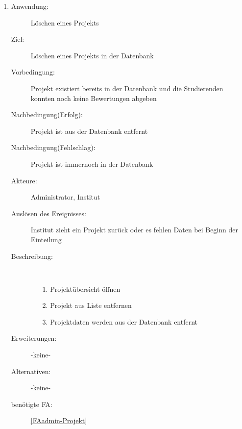 \documentclass[parskip=full]{scrartcl}
\newcommand{\swtLabel}[1]{\textbf{/#1\arabic*0/}}
\begin{document}
\begin{enumerate} [label=\swtLabel{A}]
  
  \item
  \begin{description}
  \item[Anwendung:] Löschen eines Projekts
  \item[Ziel:] Löschen eines Projekts in der Datenbank
  	\item[Vorbedingung:] Projekt existiert bereits in der Datenbank und die
  	Studierenden konnten noch keine Bewertungen abgeben
  	\item[Nachbedingung(Erfolg):] Projekt ist aus der Datenbank entfernt
  	\item[Nachbedingung(Fehlschlag):] Projekt ist immernoch in der Datenbank
  	\item[Akteure:] Administrator, Institut
  	\item[Auslösen des Ereignisses:] Institut zieht ein Projekt zurück oder es
  	fehlen Daten bei Beginn der Einteilung
  	\item[Beschreibung:]~
  	\begin{enumerate} 
  	  \item[1.] Projektübersicht öffnen
  	  \item[2.] Projekt aus Liste entfernen
  	  \item[3.] Projektdaten werden aus der Datenbank entfernt
  	\end{enumerate}
  	\item[Erweiterungen:] -keine-
  	\item[Alternativen:] -keine-
  	\item[benötigte FA:] \ref{FAadmin-Projekt}
  \end{description}
   

\end{enumerate}
\end{document}
